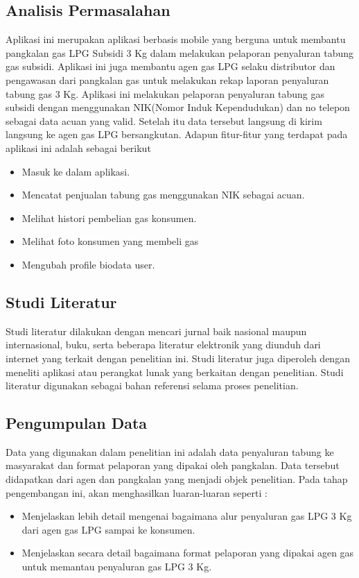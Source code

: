 \subsection{Analisis Permasalahan}
Aplikasi ini merupakan aplikasi berbasis mobile yang berguna untuk membantu pangkalan gas LPG Subsidi 3 Kg dalam melakukan pelaporan penyaluran tabung gas subsidi. Aplikasi ini juga membantu agen gas LPG selaku distributor dan pengawasan dari pangkalan gas untuk melakukan rekap laporan penyaluran tabung gas 3 Kg. Aplikasi ini melakukan pelaporan penyaluran tabung gas subsidi dengan menggunakan NIK(Nomor Induk Kependudukan) dan no telepon sebagai data acuan yang valid. Setelah itu data tersebut langsung di kirim langsung ke agen gas LPG bersangkutan. Adapun fitur-fitur yang terdapat pada aplikasi ini adalah sebagai berikut
\begin{itemize}
		\itemsep0em
		\item Masuk ke dalam aplikasi.
		\item Mencatat penjualan tabung gas menggunakan NIK sebagai acuan.
		\item Melihat histori pembelian gas konsumen.
		\item Melihat foto konsumen yang membeli gas
		\item Mengubah profile biodata user.
\end{itemize}

\subsection{Studi Literatur}
Studi literatur dilakukan dengan mencari jurnal baik nasional maupun internasional, buku, serta beberapa literatur elektronik yang diunduh dari internet yang terkait dengan penelitian ini. Studi literatur juga diperoleh dengan meneliti aplikasi atau perangkat lunak yang berkaitan dengan penelitian. Studi literatur digunakan sebagai bahan referensi selama proses penelitian.

\subsection{Pengumpulan Data}
Data yang digunakan dalam penelitian ini adalah data penyaluran tabung ke masyarakat dan format pelaporan yang dipakai oleh pangkalan. Data tersebut didapatkan dari agen dan pangkalan yang menjadi objek penelitian. Pada tahap pengembangan ini, akan menghasilkan luaran-luaran seperti :
	\begin{itemize}
		\item Menjelaskan lebih detail mengenai bagaimana alur penyaluran gas LPG 3 Kg dari agen gas LPG sampai ke konsumen.
		\item Menjelaskan secara detail bagaimana format pelaporan yang dipakai agen gas untuk memantau penyaluran gas LPG 3 Kg.
	\end{itemize}

